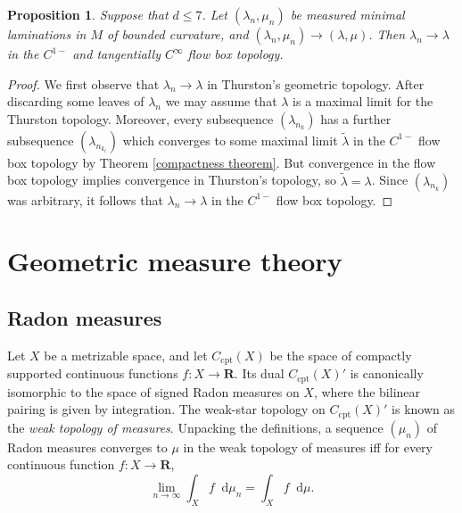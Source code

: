 \documentclass[reqno,11pt]{amsart}
\newcommand{\RR}{\mathbf{R}}
\newcommand*\dif{\mathop{}\!\mathrm{d}}
\newcommand{\dfn}[1]{\emph{#1}\index{#1}}
\newcommand{\cpt}{\mathrm{cpt}}
\newtheorem{proposition}[theorem]{Proposition}
\theoremstyle{definition}
\numberwithin{equation}{section}
\begin{document}
\begin{proposition}\label{convergence of traansverse measures means flow box convergence}
Suppose that $d \leq 7$.
Let $(\lambda_n, \mu_n)$ be measured minimal laminations in $M$ of bounded curvature, and $(\lambda_n, \mu_n) \to (\lambda, \mu)$.
Then $\lambda_n \to \lambda$ in the $C^{1-}$ and tangentially $C^\infty$ flow box topology.
\end{proposition}
\begin{proof}
We first observe that $\lambda_n \to \lambda$ in Thurston's geometric topology.
After discarding some leaves of $\lambda_n$ we may assume that $\lambda$ is a maximal limit for the Thurston topology.
Moreover, every subsequence $(\lambda_{n_k})$ has a further subsequence $(\lambda_{n_{k_\ell}})$ which converges to some maximal limit $\tilde \lambda$ in the $C^{1-}$ flow box topology by Theorem \ref{compactness theorem}.
But convergence in the flow box topology implies convergence in Thurston's topology, so $\tilde \lambda = \lambda$.
Since $(\lambda_{n_k})$ was arbitrary, it follows that $\lambda_n \to \lambda$ in the $C^{1-}$ flow box topology.
\end{proof}

\appendix 
\section{Geometric measure theory}\label{boundary appendix}
\subsection{Radon measures}\label{portmanteau appendix}
Let $X$ be a metrizable space, and let $C_\cpt(X)$ be the space of compactly supported continuous functions $f: X \to \RR$.
Its dual $C_\cpt(X)'$ is canonically isomorphic to the space of signed Radon measures on $X$, where the bilinear pairing is given by integration.
The weak-star topology on $C_\cpt(X)'$ is known as the \dfn{weak topology of measures}.
Unpacking the definitions, a sequence $(\mu_n)$ of Radon measures converges to $\mu$ in the weak topology of measures iff for every continuous function $f: X \to \RR$,
$$\lim_{n \to \infty} \int_X f \dif \mu_n = \int_X f \dif \mu.$$
\end{document}
